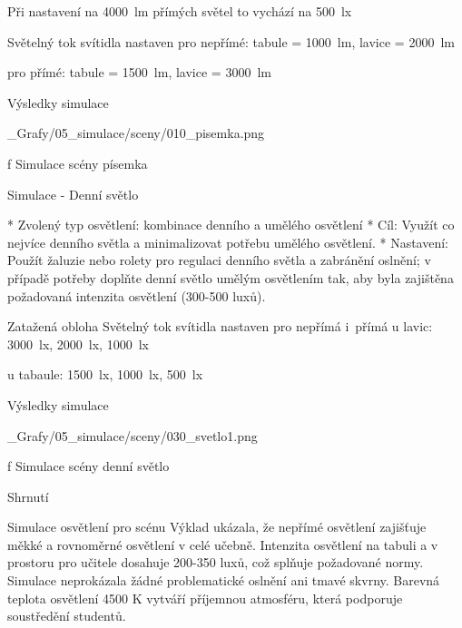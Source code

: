 \noindent Při nastavení na 4000~lm přímých světel to vychází na 500~lx

\noindent Světelný tok svítidla nastaven pro nepřímé: tabule = 1000~lm, lavice = 2000~lm

pro přímé: tabule = 1500~lm, lavice = 3000~lm

\secc Výsledky simulace

\medskip {}
\picw=15cm _Grafy/05_simulace/sceny/010_pisemka.png
\caption/f Simulace scény písemka
\medskip

\sec Simulace - Denní světlo

\begitems
* Zvolený typ osvětlení: kombinace denního a umělého osvětlení
* Cíl: Využít co nejvíce denního světla a minimalizovat potřebu umělého osvětlení.
* Nastavení: Použít žaluzie nebo rolety pro regulaci denního světla a zabránění oslnění; v případě potřeby doplňte denní světlo umělým osvětlením tak, aby byla zajištěna požadovaná intenzita osvětlení (300-500 luxů).
\enditems

\noindent Zatažená obloha
\noindent Světelný tok svítidla nastaven pro nepřímá i~přímá u lavic: 3000~lx, 2000~lx, 1000~lx

u tabaule: 1500~lx, 1000~lx, 500~lx

\secc Výsledky simulace

\medskip {}
\picw=18cm _Grafy/05_simulace/sceny/030_svetlo1.png
\caption/f Simulace scény denní světlo
\medskip




\secc Shrnutí



Simulace osvětlení pro scénu Výklad ukázala, že nepřímé osvětlení zajišťuje měkké
a rovnoměrné osvětlení v celé učebně. Intenzita osvětlení na tabuli a v prostoru pro učitele dosahuje 200-350 luxů,
což splňuje požadované normy. Simulace neprokázala žádné problematické oslnění ani tmavé skvrny. Barevná teplota
osvětlení 4500 K vytváří příjemnou atmosféru, která podporuje soustředění studentů.

